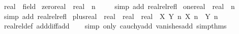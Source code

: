 \begin{isabellebody}
{\isafoldproof}%
%
\isadelimproof
\isanewline
%
\endisadelimproof
\isanewline
{}\isamarkupfalse%
\ real\ {\isacharcolon}{\kern0pt}{\isacharcolon}{\kern0pt}\ field\isanewline
{}\isanewline
\isanewline
{}\isamarkupfalse%
\ zero{\isacharunderscore}{\kern0pt}real\ {\isacharcolon}{\kern0pt}{\isacharcolon}{\kern0pt}\ {\isachardoublequoteopen}real{\isachardoublequoteclose}\ \ {\isachardoublequoteopen}{\isasymlambda}n{\isachardot}{\kern0pt}\ {}{\isachardoublequoteclose}\isanewline
%
\isadelimproof
\ \ %
\endisadelimproof
%
\isatagproof
{}\isamarkupfalse%
\ {\isacharparenleft}{\kern0pt}simp\ add{\isacharcolon}{\kern0pt}\ realrel{\isacharunderscore}{\kern0pt}refl{\isacharparenright}{\kern0pt}%
\endisatagproof
{\isafoldproof}%
%
\isadelimproof
\isanewline
%
\endisadelimproof
\isanewline
{}\isamarkupfalse%
\ one{\isacharunderscore}{\kern0pt}real\ {\isacharcolon}{\kern0pt}{\isacharcolon}{\kern0pt}\ {\isachardoublequoteopen}real{\isachardoublequoteclose}\ \ {\isachardoublequoteopen}{\isasymlambda}n{\isachardot}{\kern0pt}\ {}{\isachardoublequoteclose}\isanewline
%
\isadelimproof
\ \ %
\endisadelimproof
%
\isatagproof
{}\isamarkupfalse%
\ {\isacharparenleft}{\kern0pt}simp\ add{\isacharcolon}{\kern0pt}\ realrel{\isacharunderscore}{\kern0pt}refl{\isacharparenright}{\kern0pt}%
\endisatagproof
{\isafoldproof}%
%
\isadelimproof
\isanewline
%
\endisadelimproof
\isanewline
{}\isamarkupfalse%
\ plus{\isacharunderscore}{\kern0pt}real\ {\isacharcolon}{\kern0pt}{\isacharcolon}{\kern0pt}\ {\isachardoublequoteopen}real\ {\isasymRightarrow}\ real\ {\isasymRightarrow}\ real{\isachardoublequoteclose}\ \ {\isachardoublequoteopen}{\isasymlambda}X\ Y\ n{\isachardot}{\kern0pt}\ X\ n\ {\isacharplus}{\kern0pt}\ Y\ n{\isachardoublequoteclose}\isanewline
%
\isadelimproof
\ \ %
\endisadelimproof
%
\isatagproof
{}\isamarkupfalse%
\ realrel{\isacharunderscore}{\kern0pt}def\ add{\isacharunderscore}{\kern0pt}diff{\isacharunderscore}{\kern0pt}add\isanewline
\ \ \isamarkupfalse%
\ {\isacharparenleft}{\kern0pt}simp\ only{\isacharcolon}{\kern0pt}\ cauchy{\isacharunderscore}{\kern0pt}add\ vanishes{\isacharunderscore}{\kern0pt}add\ simp{\isacharunderscore}{\kern0pt}thms{\isacharparenright}{\kern0pt}%
\endisatagproof
{\isafoldproof}%
%
\isadelimproof
\isanewline
%
\endisadelimproof

\end{isabellebody}
